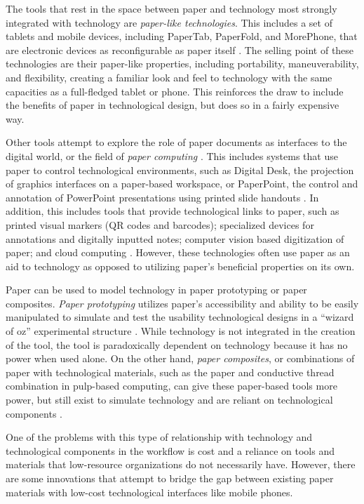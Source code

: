 \documentclass{sig-alternate}
\begin{document}
The tools that rest in the space between paper and technology most strongly integrated with technology are \emph{paper-like technologies}. This includes a set of tablets and mobile devices, including PaperTab, PaperFold, and MorePhone, that are electronic devices as reconfigurable as paper itself \cite{gomes2014,gomes2013,tarun2013}. The selling point of these technologies are their paper-like properties, including portability, maneuverability, and flexibility, creating a familiar look and feel to technology with the same capacities as a full-fledged tablet or phone. This reinforces the draw to include the benefits of paper in technological design, but does so in a fairly expensive way.

Other tools attempt to explore the role of paper documents as interfaces to the digital world, or the field of \emph{paper computing} \cite{kaplan2010}. This includes systems that use paper to control technological environments, such as Digital Desk, the projection of graphics interfaces on a paper-based workspace, or PaperPoint, the control and annotation of PowerPoint presentations using printed slide handouts \cite{newman1992,wellner1993,signer2007}. In addition, this includes tools that provide technological links to paper, such as printed visual markers (QR codes and barcodes); specialized devices for annotations and digitally inputted notes; computer vision based digitization of paper; and cloud computing \cite{kaplan2010,anoto,pietrzak2010}. However, these technologies often use paper as an aid to technology as opposed to utilizing paper's beneficial properties on its own. 

Paper can be used to model technology in paper prototyping or paper composites. \emph{Paper prototyping} utilizes paper's accessibility and ability to be easily manipulated to simulate and test the usability technological designs in a ``wizard of oz'' experimental structure \cite{synder2001,chandler2002}. While technology is not integrated in the creation of the tool, the tool is paradoxically dependent on technology because it has no power when used alone. On the other hand, \emph{paper composites}, or combinations of paper with technological materials, such as the paper and conductive thread combination in pulp-based computing, can give these paper-based tools more power, but still exist to simulate technology and are reliant on technological components \cite{coelho2009}.

One of the problems with this type of relationship with technology and technological components in the workflow is cost and a reliance on tools and materials that low-resource organizations do not necessarily have. However, there are some innovations that attempt to bridge the gap between existing paper materials with low-cost technological interfaces like mobile phones.
\end{document}
